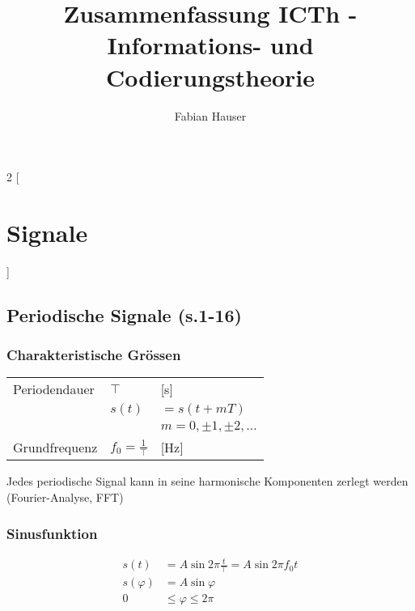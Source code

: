 

\title{Zusammenfassung ICTh - Informations- und Codierungstheorie}
\author{Fabian Hauser}
 

\maketitle
\begin{multicols}{2}
[
\section{Signale}
]

\subsection{Periodische Signale (s.1-16)}

\subsubsection{Charakteristische Grössen}
\begin{tabular}{l l l}
	Periodendauer & $\top$ & [s] \\
	 & $s(t)$ & $=s(t+mT)$ \\
	 & & $m=0,\pm 1,\pm 2,\dots$ \\
	 Grundfrequenz & $f_0=\frac{1}{\top}$ & [Hz]
\end{tabular}

Jedes periodische Signal kann in seine harmonische Komponenten zerlegt werden (Fourier-Analyse, FFT)

\subsubsection{Sinusfunktion}
	\begin{align*}
	s(t) &= A \sin{ 2 \pi \frac{t}{\top}} = A \sin{2 \pi f_0 t} \\
	s(\varphi) &= A \sin{\varphi} \\
	0&\leq \varphi \le 2 \pi
	\end{align*}
	
	\noindent{}



\end{multicols}
